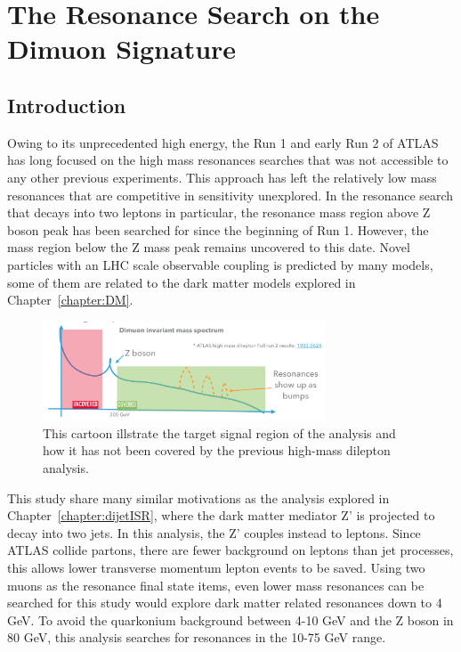 \chapter{The Resonance Search on the Dimuon Signature}
\label{chapter:dimuon}


\section{Introduction}

Owing to its unprecedented high energy, the Run 1 and early Run 2 of ATLAS has long focused on the high mass resonances searches that was not accessible to any other previous experiments. This approach has left the relatively low mass resonances that are competitive in sensitivity unexplored. In the resonance search that decays into two leptons in particular, the resonance mass region above Z boson peak has been searched for since the beginning of Run 1. However, the mass region below the Z mass peak remains uncovered to this date. Novel particles with an LHC scale observable coupling is predicted by many models, some of them are related to the dark matter models explored in Chapter~\ref{chapter:DM}.

\begin{figure}[!htb]
    \begin{center}
        \includegraphics[width=0.75\textwidth]{figures/chapter_dimuon/dimuonStudies}        
        \caption{
        This cartoon illstrate the target signal region of the analysis and how it has not been covered by the previous high-mass dilepton analysis. }
            \label{fig:dimuonstudies}
    \end{center}
\end{figure}
   
This study share many similar motivations as the analysis explored in Chapter~\ref{chapter:dijetISR}, where the dark matter mediator Z' is projected to decay into two jets. In this analysis, the Z' couples instead to leptons. Since ATLAS collide partons, there are fewer background on leptons than jet processes, this allows lower transverse momentum lepton events to be saved. Using two muons as the resonance final state items, even lower mass resonances can be searched for this study would
explore dark matter related resonances down to 4 GeV. To avoid the quarkonium background between 4-10 GeV and the Z boson in 80 GeV, this analysis searches for resonances in the 10-75 GeV range.

